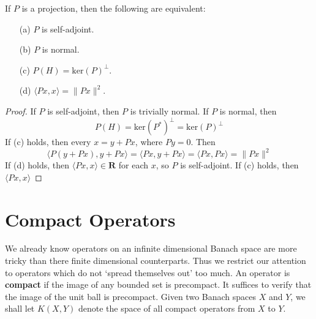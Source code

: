 \begin{theorem}
    If $P$ is a projection, then the following are equivalent:
    \begin{enumerate}
        \item[(a)] $P$ is self-adjoint.
        \item[(b)] $P$ is normal.
        \item[(c)] $P(H) = \text{ker}(P)^\perp$.
        \item[(d)] $\langle Px, x \rangle = \| Px \|^2$.
    \end{enumerate}
\end{theorem}
\begin{proof}
    If $P$ is self-adjoint, then $P$ is trivially normal. If $P$ is normal, then
    \[ P(H) = \text{ker}(P^*)^\perp = \text{ker}(P)^\perp \]
    If (c) holds, then every $x = y + Px$, where $Py = 0$. Then
    \[ \langle P(y + Px), y + Px \rangle = \langle Px, y + Px \rangle = \langle Px, Px \rangle = \| Px \|^2 \]
    If (d) holds, then $\langle Px, x \rangle \in \mathbf{R}$ for each $x$, so $P$ is self-adjoint. If (c) holds, then $\langle Px, x \rangle$
\end{proof}






\section{Compact Operators}

We already know operators on an infinite dimensional Banach space are more tricky than there finite dimensional counterparts. Thus we restrict our attention to operators which do not `spread themselves out' too much. An operator is {\bf compact} if the image of any bounded set is precompact. It suffices to verify that the image of the unit ball is precompact. Given two Banach spaces $X$ and $Y$, we shall let $K(X,Y)$ denote the space of all compact operators from $X$ to $Y$.

